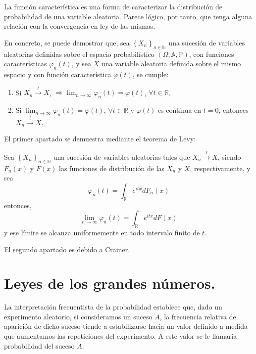 La funci\'on caracter\'istica es una forma de caracterizar la distribuci\'on de probabilidad de una variable aleatoria. Parece l\'ogico, por tanto, que tenga alguna relaci\'on con la convergencia en ley de las mismas.

En concreto, se puede demostrar que, sea $ \left\{X_n\right\}_{n\in\mathbb{N}}$ una sucesi\'on de variables aleatorias definidas sobre el espacio probabil\'istico $\left(\Omega,\mathbb{A}, \mathbb{P}\right) $, con funciones caracter\'isticas $\varphi_n(t)$, y sea $X$ una variable aleatoria definida sobre el mismo espacio y con funci\'on caracter\'istica $\varphi(t)$, se cumple:
\begin{enumerate}
\item Si $X_{n} \overset{\ell}{\to} X $, $\Rightarrow \lim_{n\to\infty}\varphi_n(t)=\varphi(t)$, $\forall t\in\mathbb{R}$.
\item Si $\lim_{n\to\infty}\varphi_n(t)=\varphi(t)$, $\forall t\in\mathbb{R}$ y $\varphi(t)$ es cont\'inua en $t=0$, entonces $X_{n} \overset{\ell}{\to} X $.
\end{enumerate}
El primer apartado se demuestra mediante el teorema de Levy:
\begin{teorema}
Sea $ \left\{X_n\right\}_{n\in\mathbb{N}}$ una sucesi\'on de variables aleatorias tales que $X_{n} \overset{\ell}{\to} X $, siendo $F_n(x)$ y $F(x)$ las funciones de distribuci\'on de las $X_n$ y $X$, respectivamente, y sea 
\begin{equation}
\varphi_n(t)=\int_{\mathbb{R}}e^{itx}dF_n(x)
\end{equation}
entonces,
\begin{equation}
\lim_{n\to\infty}\varphi_n(t)=\int_{\mathbb{R}}e^{itx}dF(x)
\end{equation}
y ese l\'imite se alcanza uniformemente en todo intervalo finito de $t$.

\end{teorema}
El segundo apartado es debido a Cramer. 

\section{Leyes de los grandes n\'umeros.}

La interpretaci\'on frecuentista de la probabilidad establece que, dado un experimento aleatorio, si consideramos un suceso $A$, la frecuencia relativa de aparici\'on de dicho suceso tiende a estabilizarse hacia un valor definido a medida que aumentamos las repeticiones del experimento. A este valor se le llamar\'ia probabilidad del suceso $A$.

